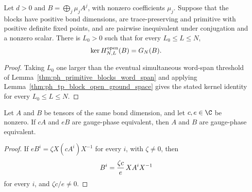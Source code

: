 \begin{lemma}
    \label{thm:ph_primitive_blocks_open_kernel}
    \leanok
    Let $d>0$ and $B=\bigoplus_j\mu_jA^j$, with nonzero coefficients $\mu_j$.
    Suppose that the blocks have positive bond dimensions, are trace-preserving
    and primitive with positive definite fixed points, and are pairwise
    inequivalent under conjugation and a nonzero scalar.
    There is $L_0>0$ such that for every $L_0\le L\le N$,
    \begin{align}
        \ker H^{\mathrm{open}}_{N,L}(B)=G_N(B).
        \notag
    \end{align}
\end{lemma}
\begin{proof}
    \leanok
    Taking $L_0$ one larger than the eventual simultaneous word-span
    threshold of Lemma~\ref{thm:ph_primitive_blocks_word_span} and applying
    Lemma~\ref{thm:ph_tp_block_open_ground_space} gives the stated kernel
    identity for every $L_0\le L\le N$.
\end{proof}

\begin{lemma}
    \label{thm:gauge_phase_equiv_of_nonzero_rescalings}
    \leanok
    Let $A$ and $B$ be tensors of the same bond dimension, and let
    $c,e\in\C$ be nonzero. If $cA$ and $eB$ are gauge-phase equivalent,
    then $A$ and $B$ are gauge-phase equivalent.
\end{lemma}
\begin{proof}
    \leanok
    If $eB^i=\zeta X(cA^i)X^{-1}$ for every $i$, with $\zeta\ne0$, then
    \begin{align}
        B^i=\frac{\zeta c}{e}\,XA^iX^{-1}
        \notag
    \end{align}
    for every $i$, and $\zeta c/e\ne0$.
\end{proof}

